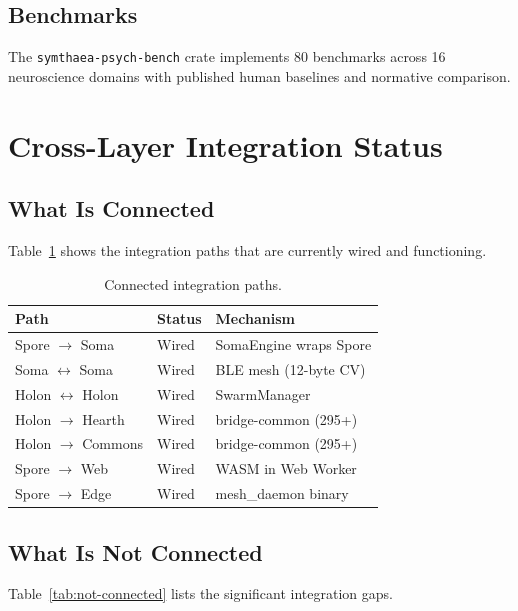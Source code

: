 \documentclass[11pt,twocolumn]{article}
\begin{document}
\subsection{Benchmarks}

The \texttt{symthaea-psych-bench} crate implements 80 benchmarks across 16 neuroscience domains with published human baselines and normative comparison.

\section{Cross-Layer Integration Status}
\label{sec:integration}

\subsection{What Is Connected}

Table~\ref{tab:connected} shows the integration paths that are currently wired and functioning.

\begin{table}[H]
\centering
\caption{Connected integration paths.}
\label{tab:connected}
\begin{tabular}{lll}
\toprule
\textbf{Path} & \textbf{Status} & \textbf{Mechanism} \\
\midrule
Spore $\to$ Soma & Wired & SomaEngine wraps Spore \\
Soma $\leftrightarrow$ Soma & Wired & BLE mesh (12-byte CV) \\
Holon $\leftrightarrow$ Holon & Wired & SwarmManager \\
Holon $\to$ Hearth & Wired & bridge-common (295+) \\
Holon $\to$ Commons & Wired & bridge-common (295+) \\
Spore $\to$ Web & Wired & WASM in Web Worker \\
Spore $\to$ Edge & Wired & mesh\_daemon binary \\
\bottomrule
\end{tabular}
\end{table}

\subsection{What Is Not Connected}

Table~\ref{tab:not-connected} lists the significant integration gaps.
\end{document}
